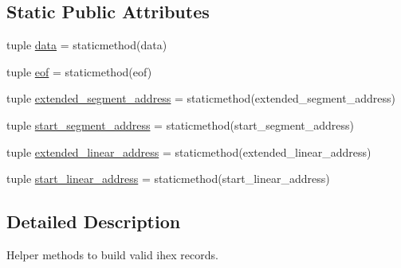 \subsection*{Static Public Attributes}
\begin{DoxyCompactItemize}
\item 
tuple \hyperlink{classsoftware_1_1chipwhisperer_1_1capture_1_1utils_1_1IntelHex_1_1Record_aeef662fd4bb0403161279105c8a62198}{data} = staticmethod(data)
\item 
tuple \hyperlink{classsoftware_1_1chipwhisperer_1_1capture_1_1utils_1_1IntelHex_1_1Record_a477afb71966aed6301c61218c9f4dba1}{eof} = staticmethod(eof)
\item 
tuple \hyperlink{classsoftware_1_1chipwhisperer_1_1capture_1_1utils_1_1IntelHex_1_1Record_a2c663a7e9a87820391387ef41f377735}{extended\+\_\+segment\+\_\+address} = staticmethod(extended\+\_\+segment\+\_\+address)
\item 
tuple \hyperlink{classsoftware_1_1chipwhisperer_1_1capture_1_1utils_1_1IntelHex_1_1Record_aac32e40d4f3228b6b0889ad0f0fb1718}{start\+\_\+segment\+\_\+address} = staticmethod(start\+\_\+segment\+\_\+address)
\item 
tuple \hyperlink{classsoftware_1_1chipwhisperer_1_1capture_1_1utils_1_1IntelHex_1_1Record_a37025192502e973c36cae2704cd0e510}{extended\+\_\+linear\+\_\+address} = staticmethod(extended\+\_\+linear\+\_\+address)
\item 
tuple \hyperlink{classsoftware_1_1chipwhisperer_1_1capture_1_1utils_1_1IntelHex_1_1Record_ad8aa161e2b23c82719b0ba93fe28c045}{start\+\_\+linear\+\_\+address} = staticmethod(start\+\_\+linear\+\_\+address)
\end{DoxyCompactItemize}


\subsection{Detailed Description}
\begin{DoxyVerb}Helper methods to build valid ihex records.\end{DoxyVerb}
 

